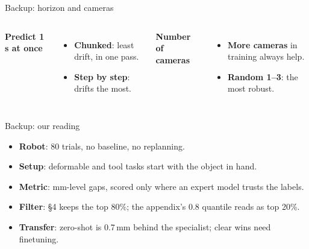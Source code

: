 \documentclass[aspectratio=169,12pt]{beamer}
\newcommand{\pw}[1]{{\color{pw}#1}}
\begin{document}
\begin{frame}[label=bk-ablations]{Backup: horizon and cameras}
  \begin{columns}[t, onlytextwidth]
      {\small\bfseries\color{pw} Predict 1\,s at once}\par\vspace{6pt}
      {\centering{}\par}\vspace{8pt}
      \footnotesize
      \begin{itemize}\setlength{\itemsep}{4pt}
        \item \textbf{Chunked}: \pw{least drift}, in one pass.
        \item \textbf{Step by step}: drifts the most.
      \end{itemize}
      {\small\bfseries\color{pw} Number of cameras}\par\vspace{6pt}
      {\centering{}\par}\vspace{8pt}
      \footnotesize
      \begin{itemize}\setlength{\itemsep}{4pt}
        \item \textbf{More cameras} in training always help.
        \item \textbf{Random 1--3}: \pw{the most robust}.
      \end{itemize}
  \end{columns}
\end{frame}

\begin{frame}[label=bk-reading]{Backup: our reading}
  \vfill
  \footnotesize
  \begin{itemize}\setlength{\itemsep}{9pt}
    \item \textbf{Robot}: 80 trials, no baseline, no replanning.
    \item \textbf{Setup}: deformable and tool tasks start with the object in hand.
    \item \textbf{Metric}: mm-level gaps, scored only where an expert model trusts the labels.
    \item \textbf{Filter}: \S4 keeps the top 80\%; the appendix's 0.8 quantile reads as top 20\%.
    \item \textbf{Transfer}: zero-shot is 0.7\,mm behind the specialist; clear wins need
      finetuning.
  \end{itemize}
  \vspace{10pt}
  \vfill
\end{frame}
\end{document}
